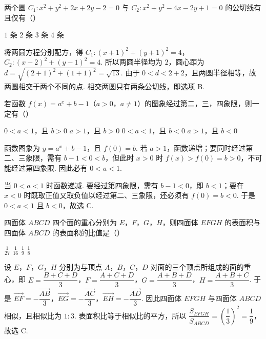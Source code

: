 \begin{problem}
两个圆 \(C_1: x^2+y^2+2x+2y-2=0\) 与 \(C_2: x^2+y^2-4x-2y+1=0\) 的公切线有且仅有（\quad）

\choices
    {\(1\) 条}
    {\(2\) 条}
    {\(3\) 条}
    {\(4\) 条}
\end{problem}

\begin{solution}
将两圆方程分别配方，得
\(C_1:\left(x+1\right)^2+\left(y+1\right)^2=4\)，\(C_2:\left(x-2\right)^2+\left(y-1\right)^2=4\).
所以两圆半径均为 \(2\)，圆心距为
\(d=\sqrt{(2+1)^2+(1+1)^2}=\sqrt{13}\).
由于 \(0<d<2+2\)，且两圆半径相等，故两圆相交于两个不同的点. 相交两圆只有两条公切线，即选项 B.
\end{solution}

\begin{problem}
若函数 \(f(x)=a^x+b-1\)（\(a>0\)，\(a\neq 1\)）的图象经过第二，三，四象限，则一定有（\quad）

\choices
    {\(0<a<1\)，且 \(b>0\)}
    {\(a>1\)，且 \(b>0\)}
    {\(0<a<1\)，且 \(b<0\)}
    {\(a>1\)，且 \(b<0\)}
\end{problem}

\begin{solution}
函数图象为 \(y=a^x+b-1\)，且 \(f(0)=b\). 若 \(a>1\)，函数递增；要同时经过第二、三象限，需有 \(b-1<0<b\)，但此时 \(x>0\) 时 \(f(x)>f(0)=b>0\)，不可能经过第四象限. 因此必有 \(0<a<1\).

当 \(0<a<1\) 时函数递减. 要经过第四象限，需有 \(b-1<0\)，即 \(b<1\)；要在 \(x<0\) 时既取正值又取负值以经过第二、三象限，还必须有 \(f(0)=b<0\). 于是 \(0<a<1\) 且 \(b<0\)，故选 C.
\end{solution}

\begin{problem}
四面体 \(ABCD\) 四个面的重心分别为 \(E\)，\(F\)，\(G\)，\(H\)，则四面体 \(EFGH\) 的表面积与四面体 \(ABCD\) 的表面积的比值是（\quad）

\choices
    {\(\frac{1}{27}\)}
    {\(\frac{1}{16}\)}
    {\(\frac{1}{9}\)}
    {\(\frac{1}{8}\)}
\end{problem}

\begin{solution}
设 \(E\)，\(F\)，\(G\)，\(H\) 分别为与顶点 \(A\)，\(B\)，\(C\)，\(D\) 对面的三个顶点所组成的面的重心，即
\(E=\dfrac{B+C+D}{3}\)，\(F=\dfrac{A+C+D}{3}\)，\(G=\dfrac{A+B+D}{3}\)，\(H=\dfrac{A+B+C}{3}\).
于是
\(\overrightarrow{EF}=-\dfrac{\overrightarrow{AB}}{3}\)，\(\overrightarrow{EG}=-\dfrac{\overrightarrow{AC}}{3}\)，\(\overrightarrow{EH}=-\dfrac{\overrightarrow{AD}}{3}\).
因此四面体 \(EFGH\) 与四面体 \(ABCD\) 相似，且相似比为 \(1:3\). 表面积比等于相似比的平方，所以
\(\dfrac{S_{EFGH}}{S_{ABCD}}=\left(\dfrac{1}{3}\right)^2=\dfrac{1}{9}\)，故选 C.
\end{solution}

